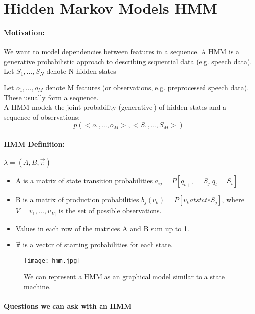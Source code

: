 
\section*{Hidden Markov Models HMM}
\paragraph{Motivation:} We want to model dependencies between features in a sequence. A HMM is a \underline{generative probabilistic approach} to describing sequential data (e.g. speech data).\\

Let \(S_1,\dots, S_N\) denote N hidden states

Let \(o_1,\dots, o_M\) denote M features (or observations, e.g. preprocessed speech data). These usually form a sequence.\\

A HMM models the joint probability (generative!) of hidden states and a sequence of observations:
\[p(<o_1,\dots, o_M>, <S_1,\dots, S_M>)\]

\paragraph{HMM Definition:} \(\lambda = (A, B, \vec{\pi})\)
\begin{itemize}
	\item A is a matrix of state transition probabilities \(a_{ij} = P[q_{t+1} = S_j | q_t = S_i]\)
	\item B is a matrix of production probabilities \(b_j(v_k) = P[v_k at state S_j]\), where \(V={v_1,\dots,v_{|V|}}\) is the set of possible observations.
	\item Values in each row of the matrices A and B sum up to 1.
	\item \(\vec{\pi}\) is a vector of starting probabilities for each state.
\end{itemize}

\begin{figure}[H]
	\centering
	\texttt{[image: hmm.jpg]}
	\caption{We can represent a HMM as an graphical model similar to a state machine.}
\end{figure}

\paragraph{Questions we can ask with an HMM}

